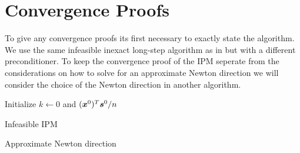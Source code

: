 \chapter{Convergence Proofs}

To give any convergence proofs its first necessary to exactly state the algorithm.
We use the same infeasible inexact long-step algorithm as in \cite{Avron-FasterRandomizedInfeasibleIPMs,Monteiro-ConvergenceAnalysisLongStepInfeasibleIPMs} but with a different preconditioner.
To keep the convergence proof of the IPM seperate from the considerations on how to solve for an approximate Newton direction we will consider the choice of the Newton direction in another algorithm.

\begin{algorithm} \label{alg:ipm}
  Initialize \(k \leftarrow 0\) and \((\bm{x}^0)^T \bm{s}^0 /n\)\;
  \;
  \caption{Infeasible IPM}
\end{algorithm}

\begin{algorithm}
  \caption{Approximate Newton direction} \label{alg:newton-direction}
\end{algorithm}
